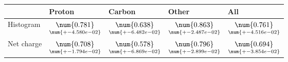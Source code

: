 \begin{tabular}{lllll}
\toprule
{} &                                              Proton &                                              Carbon &                                               Other &                                                 All \\
\midrule
Histogram  &  $\underset{\num{+- 4.580e-02 }  }{\num{ 0.781 } }$ &  $\underset{\num{+- 6.482e-02 }  }{\num{ 0.638 } }$ &  $\underset{\num{+- 2.487e-02 }  }{\num{ 0.863 } }$ &  $\underset{\num{+- 4.516e-02 }  }{\num{ 0.761 } }$ \\
Net charge &  $\underset{\num{+- 1.794e-02 }  }{\num{ 0.708 } }$ &  $\underset{\num{+- 6.869e-02 }  }{\num{ 0.578 } }$ &  $\underset{\num{+- 2.899e-02 }  }{\num{ 0.796 } }$ &  $\underset{\num{+- 3.854e-02 }  }{\num{ 0.694 } }$ \\
\bottomrule
\end{tabular}
